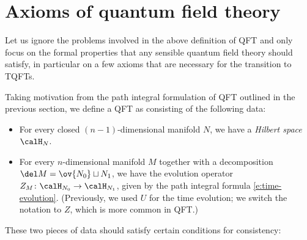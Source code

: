 \section{Axioms of quantum field theory}\label{s:axioms-field-theory}

Let us ignore the problems involved in the above definition of QFT and
only focus on the formal properties that any sensible quantum field theory
should satisfy, in particular on a few
axioms that are necessary for the transition to TQFTs.

Taking motivation from the path integral formulation of QFT outlined in the
previous section, we define a QFT as consisting of the following data:
\begin{itemize}
  \item For every closed $(n-1)$-dimensional manifold $N$, we have a
    \emph{Hilbert space} $\calH_N$.
  \item For every $n$-dimensional manifold $M$ together with a decomposition
    $\del M=\ov{N_0}\sqcup N_1$, we have the evolution operator $Z_M\colon
   \calH_{N_0}\to \calH_{N_1}$, given by the path integral formula
   \eqref{e:time-evolution}. (Previously, we used $U$ for the time
  evolution; we switch the notation to $Z$, which is more common in QFT.)
\end{itemize}

These two pieces of data should satisfy certain conditions for consistency:

